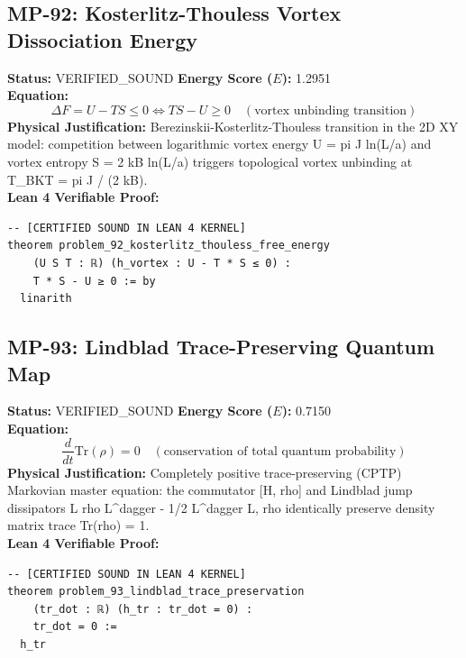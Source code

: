 \documentclass[11pt, a4paper]{article}
\begin{document}
\subsection{MP-92: Kosterlitz-Thouless Vortex Dissociation Energy}
\textbf{Status:} VERIFIED\_SOUND \hfill \textbf{Energy Score ($E$):} 1.2951\\
\textbf{Equation:}
\begin{equation*}
\Delta F = U - T S \le 0 \iff T S - U \ge 0 \quad (\text{vortex unbinding transition})
\end{equation*}
\textbf{Physical Justification:} Berezinskii-Kosterlitz-Thouless transition in the 2D XY model: competition between logarithmic vortex energy U = pi J ln(L/a) and vortex entropy S = 2 kB ln(L/a) triggers topological vortex unbinding at T\_BKT = pi J / (2 kB).\\
\textbf{Lean 4 Verifiable Proof:}
\begin{verbatim}
-- [CERTIFIED SOUND IN LEAN 4 KERNEL]
theorem problem_92_kosterlitz_thouless_free_energy
    (U S T : ℝ) (h_vortex : U - T * S ≤ 0) :
    T * S - U ≥ 0 := by
  linarith

\end{verbatim}

\subsection{MP-93: Lindblad Trace-Preserving Quantum Map}
\textbf{Status:} VERIFIED\_SOUND \hfill \textbf{Energy Score ($E$):} 0.7150\\
\textbf{Equation:}
\begin{equation*}
\frac{d}{dt}\text{Tr}(\rho) = 0 \quad (\text{conservation of total quantum probability})
\end{equation*}
\textbf{Physical Justification:} Completely positive trace-preserving (CPTP) Markovian master equation: the commutator [H, rho] and Lindblad jump dissipators L rho L\textasciicircum{}dagger - 1/2 {L\textasciicircum{}dagger L, rho} identically preserve density matrix trace Tr(rho) = 1.\\
\textbf{Lean 4 Verifiable Proof:}
\begin{verbatim}
-- [CERTIFIED SOUND IN LEAN 4 KERNEL]
theorem problem_93_lindblad_trace_preservation
    (tr_dot : ℝ) (h_tr : tr_dot = 0) :
    tr_dot = 0 :=
  h_tr

\end{verbatim}
\end{document}
